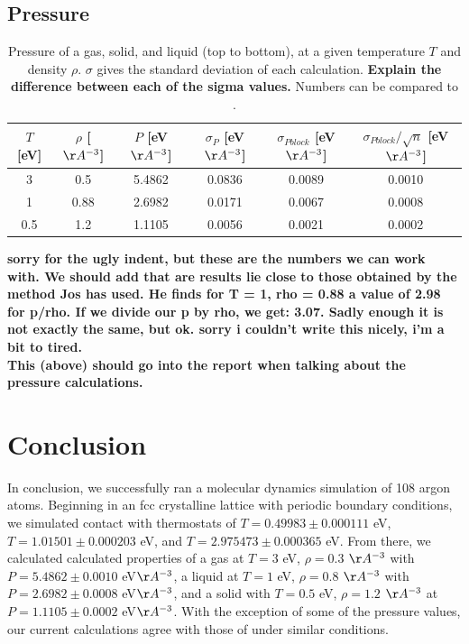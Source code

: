 \documentclass{article}
\begin{document}
\begin{multicols}{2}
\subsection{Pressure}

\begin{table}
\begin{center}
\begin{tabular}{| c | c | c | c | c | c |}
\hline  $T$ [eV] & $\rho$ [$\AA ^{-3}$] & $P$ [eV$\AA ^{-3}$] & $\sigma_{P}$ [eV$\AA ^{-3}$]  & $\sigma_{Pblock}$ [eV$\AA ^{-3}$] & $\sigma_{Pblock}/ \sqrt n$ [eV$\AA ^{-3}$] \\ \hline
  3 & 0.5 & 5.4862 & 0.0836 & 0.0089 & 0.0010 \\ \hline
  1 & 0.88 & 2.6982 & 0.0171 & 0.0067 & 0.0008 \\ \hline
  0.5 & 1.2 & 1.1105 & 0.0056 & 0.0021 & 0.0002 \\ \hline
\end{tabular}
\label{pressuretab}
\caption{Pressure of a gas, solid, and liquid (top to bottom), at a given temperature $T$ and density $\rho$.  $\sigma$ gives the standard deviation of each calculation.  \textbf{Explain the difference between each of the sigma values.}  Numbers can be compared to \cite{thijssen}.}
\end{center}
\end{table}

\textbf{sorry for the ugly indent, but these are the numbers we can work with. We should add that are results lie close to those obtained by the method Jos has used. He finds for T = 1, rho = 0.88 a value of 2.98 for p/rho. If we divide our p by rho, we get: 3.07. Sadly enough it is not exactly the same, but ok. sorry i couldn't write this nicely, i'm a bit to tired.}\\

\textbf{This (above) should go into the report when talking about the pressure calculations.}

\section{Conclusion}
\label{conc}

In conclusion, we successfully ran a molecular dynamics simulation of 108 argon atoms.  Beginning in an fcc crystalline lattice with periodic boundary conditions, we simulated contact with thermostats of $T=0.49983 \pm 0.000111$ eV, $T= 1.01501 \pm 0.000203$ eV, and $T=2.975473 \pm 0.000365$ eV.  From there, we calculated calculated properties of a gas at $T=3$ eV, $\rho=0.3$ $\AA ^{-3}$ with $P=5.4862 \pm 0.0010 $ eV$\AA^{-3}$, a liquid at $T=1$ eV, $\rho =0.8$ $\AA ^{-3}$ with $P=2.6982 \pm 0.0008$ eV$\AA^{-3}$, and a solid with $T=0.5$ eV, $\rho=1.2$ $\AA ^{-3}$ at $P=1.1105 \pm 0.0002 $ eV$\AA^{-3}$.  With the exception of some of the pressure values, our current calculations agree with those of \cite{thijssen} under similar conditions.  \\


\end{multicols}
\end{document}
